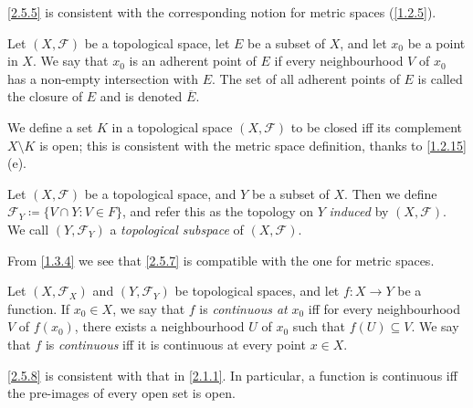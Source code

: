 \begin{note}
  \cref{2.5.5} is consistent with the corresponding notion for metric spaces (\cref{1.2.5}).
\end{note}

\begin{definition}[Closure]\label{2.5.6}
  Let \((X, \mathcal{F})\) be a topological space, let \(E\) be a subset of \(X\), and let \(x_0\) be a point in \(X\).
  We say that \(x_0\) is an adherent point of \(E\) if every neighbourhood \(V\) of \(x_0\) has a non-empty intersection with \(E\).
  The set of all adherent points of \(E\) is called the closure of \(E\) and is denoted \(\overline{E}\).
\end{definition}

\begin{note}
  We define a set \(K\) in a topological space \((X, \mathcal{F})\) to be closed iff its complement \(X \setminus K\) is open;
  this is consistent with the metric space definition, thanks to \cref{1.2.15}(e).
\end{note}

\begin{definition}\label{2.5.7}
  Let \((X, \mathcal{F})\) be a topological space, and \(Y\) be a subset of \(X\).
  Then we define \(\mathcal{F}_Y \coloneqq \{V \cap Y : V \in F\}\), and refer this as the topology on \(Y\) \emph{induced} by \((X, \mathcal{F})\).
  We call \((Y, \mathcal{F}_Y)\) a \emph{topological subspace} of \((X, \mathcal{F})\).
\end{definition}

\begin{note}
  From \cref{1.3.4} we see that \cref{2.5.7} is compatible with the one for metric spaces.
\end{note}

\begin{definition}\label{2.5.8}
  Let \((X, \mathcal{F}_X)\) and \((Y, \mathcal{F}_Y)\) be topological spaces, and let \(f : X \to Y\) be a function.
  If \(x_0 \in X\), we say that \(f\) is \emph{continuous at} \(x_0\) iff for every neighbourhood \(V\) of \(f(x_0)\), there exists a neighbourhood \(U\) of \(x_0\) such that \(f(U) \subseteq V\).
  We say that \(f\) is \emph{continuous} iff it is continuous at every point \(x \in X\).
\end{definition}

\begin{note}
  \cref{2.5.8} is consistent with that in \cref{2.1.1}.
  In particular, a function is continuous iff the pre-images of every open set is open.
\end{note}

